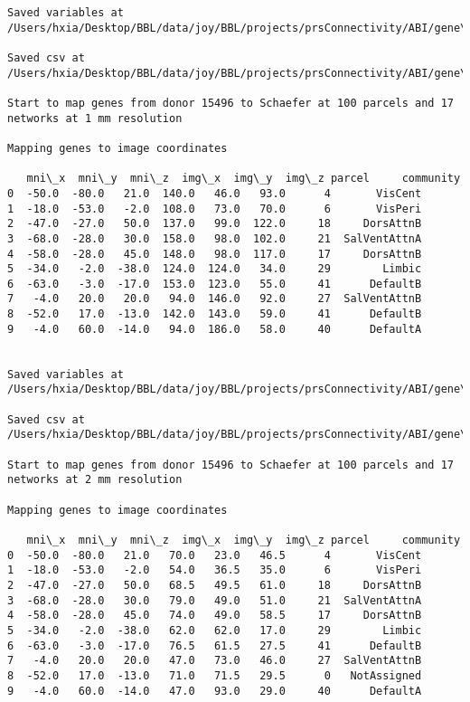 \documentclass[11pt]{article}
\begin{document}
\begin{Verbatim}[commandchars=\\\{\}]
Saved variables at /Users/hxia/Desktop/BBL/data/joy/BBL/projects/prsConnectivity/ABI/gene\_mapping/15496donor\_100Parcels\_7Network\_2mm.pkl

Saved csv at /Users/hxia/Desktop/BBL/data/joy/BBL/projects/prsConnectivity/ABI/gene\_mapping/15496donor\_100Parcels\_7Network\_2mm.csv

Start to map genes from donor 15496 to Schaefer at 100 parcels and 17 networks at 1 mm resolution

Mapping genes to image coordinates

   mni\_x  mni\_y  mni\_z  img\_x  img\_y  img\_z parcel     community
0  -50.0  -80.0   21.0  140.0   46.0   93.0      4       VisCent
1  -18.0  -53.0   -2.0  108.0   73.0   70.0      6       VisPeri
2  -47.0  -27.0   50.0  137.0   99.0  122.0     18     DorsAttnB
3  -68.0  -28.0   30.0  158.0   98.0  102.0     21  SalVentAttnA
4  -58.0  -28.0   45.0  148.0   98.0  117.0     17     DorsAttnB
5  -34.0   -2.0  -38.0  124.0  124.0   34.0     29        Limbic
6  -63.0   -3.0  -17.0  153.0  123.0   55.0     41      DefaultB
7   -4.0   20.0   20.0   94.0  146.0   92.0     27  SalVentAttnB
8  -52.0   17.0  -13.0  142.0  143.0   59.0     41      DefaultB
9   -4.0   60.0  -14.0   94.0  186.0   58.0     40      DefaultA


Saved variables at /Users/hxia/Desktop/BBL/data/joy/BBL/projects/prsConnectivity/ABI/gene\_mapping/15496donor\_100Parcels\_17Network\_1mm.pkl

Saved csv at /Users/hxia/Desktop/BBL/data/joy/BBL/projects/prsConnectivity/ABI/gene\_mapping/15496donor\_100Parcels\_17Network\_1mm.csv

Start to map genes from donor 15496 to Schaefer at 100 parcels and 17 networks at 2 mm resolution

Mapping genes to image coordinates

   mni\_x  mni\_y  mni\_z  img\_x  img\_y  img\_z parcel     community
0  -50.0  -80.0   21.0   70.0   23.0   46.5      4       VisCent
1  -18.0  -53.0   -2.0   54.0   36.5   35.0      6       VisPeri
2  -47.0  -27.0   50.0   68.5   49.5   61.0     18     DorsAttnB
3  -68.0  -28.0   30.0   79.0   49.0   51.0     21  SalVentAttnA
4  -58.0  -28.0   45.0   74.0   49.0   58.5     17     DorsAttnB
5  -34.0   -2.0  -38.0   62.0   62.0   17.0     29        Limbic
6  -63.0   -3.0  -17.0   76.5   61.5   27.5     41      DefaultB
7   -4.0   20.0   20.0   47.0   73.0   46.0     27  SalVentAttnB
8  -52.0   17.0  -13.0   71.0   71.5   29.5      0   NotAssigned
9   -4.0   60.0  -14.0   47.0   93.0   29.0     40      DefaultA



\end{Verbatim}
\end{document}
